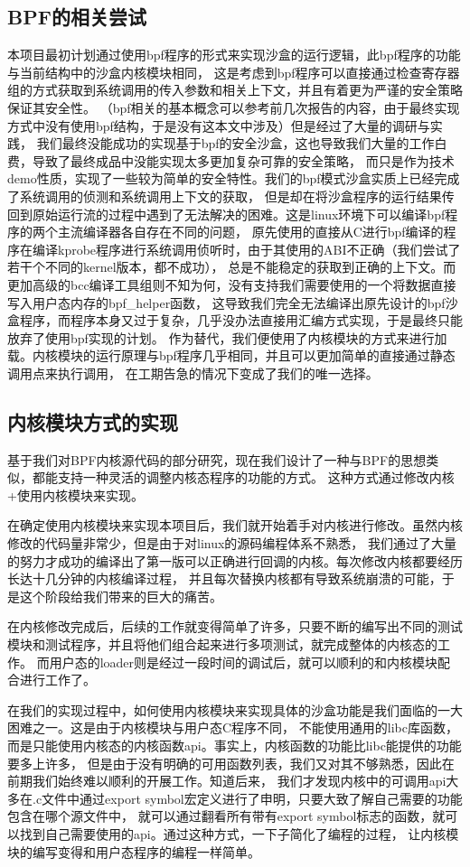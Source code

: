 \documentclass[AutoFakeBold,a4paper]{ctexart}
\begin{document}
\subsection{BPF的相关尝试}
本项目最初计划通过使用bpf程序的形式来实现沙盒的运行逻辑，此bpf程序的功能与当前结构中的沙盒内核模块相同，
这是考虑到bpf程序可以直接通过检查寄存器组的方式获取到系统调用的传入参数和相关上下文，并且有着更为严谨的安全策略保证其安全性。
（bpf相关的基本概念可以参考前几次报告的内容，由于最终实现方式中没有使用bpf结构，于是没有这本文中涉及）但是经过了大量的调研与实践，
我们最终没能成功的实现基于bpf的安全沙盒，这也导致我们大量的工作白费，导致了最终成品中没能实现太多更加复杂可靠的安全策略，
而只是作为技术demo性质，实现了一些较为简单的安全特性。我们的bpf模式沙盒实质上已经完成了系统调用的侦测和系统调用上下文的获取，
但是却在将沙盒程序的运行结果传回到原始运行流的过程中遇到了无法解决的困难。这是linux环境下可以编译bpf程序的两个主流编译器各自存在不同的问题，
原先使用的直接从C进行bpf编译的程序在编译kprobe程序进行系统调用侦听时，由于其使用的ABI不正确（我们尝试了若干个不同的kernel版本，都不成功），
总是不能稳定的获取到正确的上下文。而更加高级的bcc编译工具组则不知为何，没有支持我们需要使用的一个将数据直接写入用户态内存的bpf\_helper函数，
这导致我们完全无法编译出原先设计的bpf沙盒程序，而程序本身又过于复杂，几乎没办法直接用汇编方式实现，于是最终只能放弃了使用bpf实现的计划。
作为替代，我们便使用了内核模块的方式来进行加载。内核模块的运行原理与bpf程序几乎相同，并且可以更加简单的直接通过静态调用点来执行调用，
在工期告急的情况下变成了我们的唯一选择。

\subsection{内核模块方式的实现}
基于我们对BPF内核源代码的部分研究，现在我们设计了一种与BPF的思想类似，都能支持一种灵活的调整内核态程序的功能的方式。
这种方式通过修改内核+使用内核模块来实现。

在确定使用内核模块来实现本项目后，我们就开始着手对内核进行修改。虽然内核修改的代码量非常少，但是由于对linux的源码编程体系不熟悉，
我们通过了大量的努力才成功的编译出了第一版可以正确进行回调的内核。每次修改内核都要经历长达十几分钟的内核编译过程，
并且每次替换内核都有导致系统崩溃的可能，于是这个阶段给我们带来的巨大的痛苦。  

在内核修改完成后，后续的工作就变得简单了许多，只要不断的编写出不同的测试模块和测试程序，并且将他们组合起来进行多项测试，就完成整体的内核态的工作。
而用户态的loader则是经过一段时间的调试后，就可以顺利的和内核模块配合进行工作了。

在我们的实现过程中，如何使用内核模块来实现具体的沙盒功能是我们面临的一大困难之一。这是由于内核模块与用户态C程序不同，
不能使用通用的libc库函数，而是只能使用内核态的内核函数api。事实上，内核函数的功能比libc能提供的功能要多上许多，
但是由于没有明确的可用函数列表，我们又对其不够熟悉，因此在前期我们始终难以顺利的开展工作。知道后来，
我们才发现内核中的可调用api大多在.c文件中通过export symbol宏定义进行了申明，只要大致了解自己需要的功能包含在哪个源文件中，
就可以通过翻看所有带有export symbol标志的函数，就可以找到自己需要使用的api。通过这种方式，一下子简化了编程的过程，
让内核模块的编写变得和用户态程序的编程一样简单。
\end{document}

